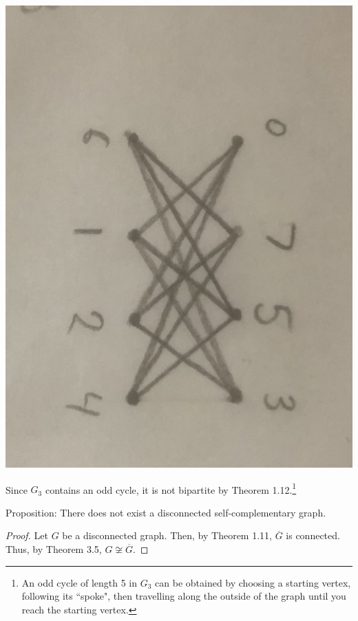 \documentclass[12pt]{article}
\begin{document}
\begin{center}
\includegraphics[scale=.05]{34G2.jpg}
\end{center}

Since $G_3$ contains an odd cycle, it is not bipartite by Theorem 1.12.\footnote{An odd cycle of length 5 in $G_3$ can be obtained by choosing a starting vertex, following its ``spoke", then travelling along the outside of the graph until you reach the starting vertex.}

\newpage{} Proposition: There does not exist a disconnected self-complementary graph.
\begin{proof}
    Let $G$ be a disconnected graph.
    Then, by Theorem 1.11, $\overline G$ is connected.
    Thus, by Theorem 3.5, $G \not \cong \overline G$.
\end{proof}
\end{document}
